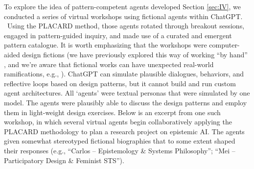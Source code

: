 \documentclass[acmlarge,timestamp]{acmart}
\begin{document}
{To explore the idea of pattern-competent agents developed Section \ref{sec:IV}, we conducted a series of virtual workshops using fictional agents within ChatGPT. ~Using the PLACARD method, those agents rotated through breakout sessions, engaged in pattern-guided inquiry, and made use of a curated and emergent pattern catalogue.  It is worth emphasizing that the workshops were computer-aided design fictions (we have previously explored this way of working “by hand” \cite{fictional-peeragogical}, and we’re aware that fictional works can have unexpected real-world ramifications, e.g., \cite{enwiki:1290575156}).  ChatGPT can simulate plausible dialogues, behaviors, and reflective loops based on design patterns, but it cannot build and run custom agent architectures.  All `agents' were textual personas that were simulated by one model.  The agents were plausibly able to discuss the design patterns and employ them in light-weight design exercises.  Below is an excerpt from one such workshop,
in which several virtual agents begin collaboratively applying the PLACARD methodology to plan a research project on epistemic AI.  The agents given somewhat stereotyped fictional biographies that to some extent shaped their responses (e.g., “Carlos – Epistemology \& Systems Philosophy”; “Mei – Participatory Design \& Feminist STS”).
\smallskip

}
\end{document}
